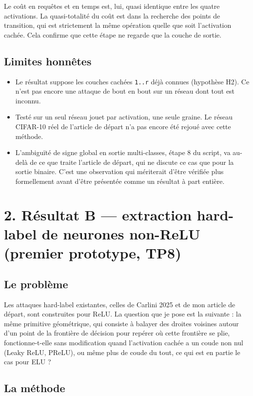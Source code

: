 \documentclass[11pt]{article}
\begin{document}
Le coût en requêtes et en temps est, lui, quasi identique entre les quatre activations. La quasi-totalité du coût est dans la recherche des points de transition, qui est strictement la même opération quelle que soit l'activation cachée. Cela confirme que cette étape ne regarde que la couche de sortie.

\subsection*{Limites honnêtes}

\begin{itemize}
  \item Le résultat suppose les couches cachées \texttt{1..r} déjà connues (hypothèse H2). Ce n'est pas encore une attaque de bout en bout sur un réseau dont tout est inconnu.
  \item Testé sur un seul réseau jouet par activation, une seule graine. Le réseau CIFAR-10 réel de l'article de départ n'a pas encore été rejoué avec cette méthode.
  \item L'ambiguïté de signe global en sortie multi-classes, étape 8 du script, va au-delà de ce que traite l'article de départ, qui ne discute ce cas que pour la sortie binaire. C'est une observation qui mériterait d'être vérifiée plus formellement avant d'être présentée comme un résultat à part entière.
\end{itemize}

\section*{2. Résultat B --- extraction hard-label de neurones non-ReLU (premier prototype, TP8)}

\subsection*{Le problème}

Les attaques hard-label existantes, celles de Carlini 2025 et de mon article de départ, sont construites pour ReLU. La question que je pose est la suivante : la même primitive géométrique, qui consiste à balayer des droites voisines autour d'un point de la frontière de décision pour repérer où cette frontière se plie, fonctionne-t-elle sans modification quand l'activation cachée a un coude non nul (Leaky ReLU, PReLU), ou même plus de coude du tout, ce qui est en partie le cas pour ELU ?

\subsection*{La méthode}
\end{document}
